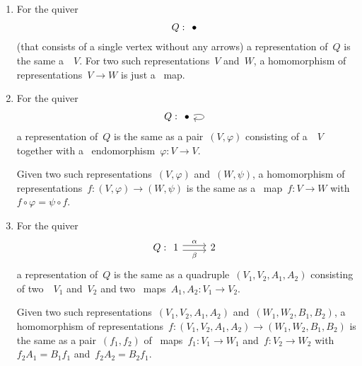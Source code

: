 \begin{example}
  \leavevmode
  \begin{enumerate}
    \item
      For the quiver
      \[
        Q :
        \begin{tikzcd}
          \bullet
        \end{tikzcd}
      \]
      (that consists of a single vertex without any arrows) a representation of~$Q$ is the same a~{\module{$\kf$}}~$V$.
      For two such representations~$V$ and~$W$, a homomorphism of representations~$V \to W$ is just a~{\klin} map.
    \item
      For the quiver
      \[
        Q :
        \begin{tikzcd}
          \bullet
          \arrow[loop right]
        \end{tikzcd}
      \]
      a representation of~$Q$ is the same as a pair~$(V,\varphi)$ consisting of a~{\module{$\kf$}}~$V$ together with a~{\klin} endomorphism~$\varphi \colon V \to V$.
      
      Given two such representations~$(V, \varphi)$ and~$(W,\psi)$, a homomorphism of representations~$f \colon (V,\varphi) \to (W,\psi)$ is the same as a~{\klin} map~$f \colon V \to W$ with~$f \circ \varphi = \psi \circ f$.
    \item
      For the quiver
      \[
        Q :
        \begin{tikzcd}
            1
            \arrow[shift left]{r}[above]{\alpha}
            \arrow[shift right]{r}[below]{\beta}
          & 2
        \end{tikzcd}
      \]
      a representation of~$Q$ is the same as a quadruple~$(V_1,V_2,A_1,A_2)$ consisting of two~{\modules{$\kf$}}~$V_1$ and~$V_2$ and two~{\klin} maps~$A_1, A_2 \colon V_1 \to V_2$.
      
      Given two such representations~$(V_1, V_2, A_1, A_2)$ and~$(W_1, W_2, B_1, B_2)$, a homomorphism of representations~$f \colon (V_1, V_2, A_1, A_2) \to (W_1, W_2, B_1, B_2)$ is the same as a pair~$(f_1, f_2)$ of~{\klin} maps~$f_1 \colon V_1 \to W_1$ and~$f \colon V_2 \to W_2$ with~$f_2 A_1 = B_1 f_1$ and~$f_2 A_2 = B_2 f_1$.
  \end{enumerate}
\end{example}









